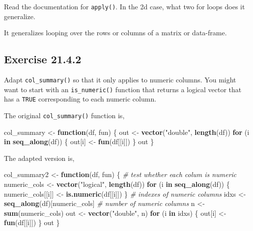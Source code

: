 \documentclass[]{book}
\newenvironment{Shaded}{\begin{snugshade}}{\end{snugshade}}
\newcommand{\CommentTok}[1]{\textcolor[rgb]{0.56,0.35,0.01}{\textit{#1}}}
\newcommand{\ControlFlowTok}[1]{\textcolor[rgb]{0.13,0.29,0.53}{\textbf{#1}}}
\newcommand{\KeywordTok}[1]{\textcolor[rgb]{0.13,0.29,0.53}{\textbf{#1}}}
\newcommand{\NormalTok}[1]{#1}
\newcommand{\StringTok}[1]{\textcolor[rgb]{0.31,0.60,0.02}{#1}}
\theoremstyle{plain}
\theoremstyle{remark}
\theoremstyle{definition}
\theoremstyle{definition}
\theoremstyle{definition}
\theoremstyle{remark}
\begin{document}
Read the documentation for \texttt{apply()}. In the 2d case, what two
for loops does it generalize.

It generalizes looping over the rows or columns of a matrix or
data-frame.

\hypertarget{exercise-21.4.2}{%
\subsection*{\texorpdfstring{Exercise
{21.4.2}}{Exercise 21.4.2}}\label{exercise-21.4.2}}

Adapt \texttt{col\_summary()} so that it only applies to numeric
columns. You might want to start with an \texttt{is\_numeric()} function
that returns a logical vector that has a \texttt{TRUE} corresponding to
each numeric column.

The original \texttt{col\_summary()} function is,

\begin{Shaded}
\begin{Highlighting}[]
\NormalTok{col_summary <-}\StringTok{ }\ControlFlowTok{function}\NormalTok{(df, fun) \{}
\NormalTok{  out <-}\StringTok{ }\KeywordTok{vector}\NormalTok{(}\StringTok{"double"}\NormalTok{, }\KeywordTok{length}\NormalTok{(df))}
  \ControlFlowTok{for}\NormalTok{ (i }\ControlFlowTok{in} \KeywordTok{seq_along}\NormalTok{(df)) \{}
\NormalTok{    out[i] <-}\StringTok{ }\KeywordTok{fun}\NormalTok{(df[[i]])}
\NormalTok{  \}}
\NormalTok{  out}
\NormalTok{\}}
\end{Highlighting}
\end{Shaded}

The adapted version is,

\begin{Shaded}
\begin{Highlighting}[]
\NormalTok{col_summary2 <-}\StringTok{ }\ControlFlowTok{function}\NormalTok{(df, fun) \{}
  \CommentTok{# test whether each colum is numeric}
\NormalTok{  numeric_cols <-}\StringTok{ }\KeywordTok{vector}\NormalTok{(}\StringTok{"logical"}\NormalTok{, }\KeywordTok{length}\NormalTok{(df))}
  \ControlFlowTok{for}\NormalTok{ (i }\ControlFlowTok{in} \KeywordTok{seq_along}\NormalTok{(df)) \{}
\NormalTok{    numeric_cols[[i]] <-}\StringTok{ }\KeywordTok{is.numeric}\NormalTok{(df[[i]])}
\NormalTok{  \}}
  \CommentTok{# indexes of numeric columns}
\NormalTok{  idxs <-}\StringTok{ }\KeywordTok{seq_along}\NormalTok{(df)[numeric_cols]}
  \CommentTok{# number of numeric columns}
\NormalTok{  n <-}\StringTok{ }\KeywordTok{sum}\NormalTok{(numeric_cols)}
\NormalTok{  out <-}\StringTok{ }\KeywordTok{vector}\NormalTok{(}\StringTok{"double"}\NormalTok{, n)}
  \ControlFlowTok{for}\NormalTok{ (i }\ControlFlowTok{in}\NormalTok{ idxs) \{}
\NormalTok{    out[i] <-}\StringTok{ }\KeywordTok{fun}\NormalTok{(df[[i]])}
\NormalTok{  \}}
\NormalTok{  out}
\NormalTok{\}}
\end{Highlighting}
\end{Shaded}
\end{document}
